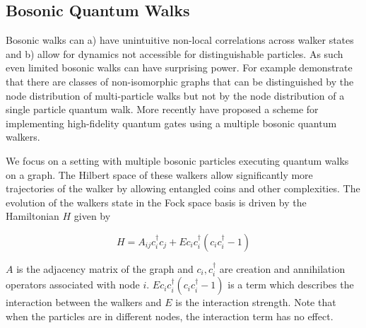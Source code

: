 \documentclass{article}
\begin{document}
\subsection{Bosonic Quantum Walks}
Bosonic walks can a) have unintuitive non-local correlations across walker states and b) allow for dynamics not accessible for distinguishable particles. As such even limited bosonic walks can have surprising power. For example \cite{gamble2010twoparticle} demonstrate that there are classes of non-isomorphic graphs that can be distinguished by the node distribution of multi-particle walks but not by the node distribution of a single particle quantum walk.
More recently \cite{Lahini_2018} have proposed a scheme for implementing high-fidelity quantum gates using a multiple bosonic quantum walkers. 




We focus on a setting with multiple bosonic particles executing quantum walks on a graph. The Hilbert space of these walkers allow significantly more trajectories of the walker by allowing entangled coins and other complexities. The evolution of the walkers state in the Fock space basis is driven by the Hamiltonian $H$ given by

$$ H = A_{ij}c_i^\dagger c_j + E c_ic_i^\dagger (c_ic_i^\dagger- 1)$$

$A$ is the adjacency matrix of the graph and $c_i,c_i^\dagger$ are creation and annihilation operators associated with node $i$. 
$Ec_ic_i^\dagger (c_ic_i^\dagger- 1)$ is a term which describes the interaction between the walkers and $E$ is the interaction strength. Note that when the particles are in different nodes, the interaction term has no effect. %
\end{document}

